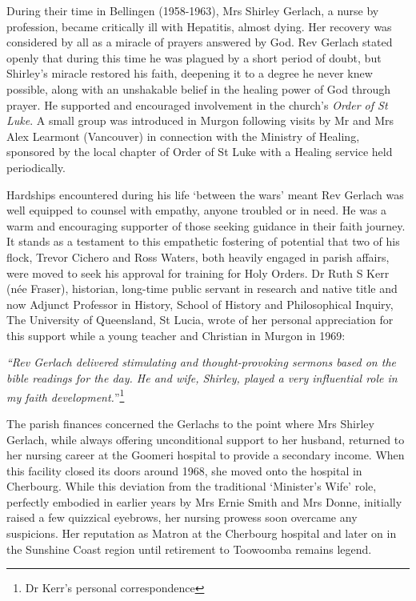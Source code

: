 During their time in Bellingen (1958-1963), Mrs Shirley Gerlach, a nurse by profession, became critically ill with Hepatitis, almost dying. Her recovery was considered by all as a miracle of prayers answered by God. Rev Gerlach stated openly that during this time he was plagued by a short period of doubt, but Shirley's miracle restored his faith, deepening it to a degree he never knew possible, along with an unshakable belief in the healing power of God through prayer. He supported and encouraged involvement in the church's \emph{Order of St Luke}. A small group was introduced in Murgon following visits by Mr and Mrs Alex Learmont (Vancouver) in connection with the Ministry of Healing, sponsored by the local chapter of Order of St Luke with a Healing service held periodically.

Hardships encountered during his life `between the wars' meant Rev Gerlach was well equipped to counsel with empathy, anyone troubled or in need. He was a warm and encouraging supporter of those seeking guidance in their faith journey. It stands as a testament to this empathetic fostering of potential that two of his flock, Trevor Cichero and Ross Waters, both heavily engaged in parish affairs, were moved to seek his approval for training for Holy Orders. Dr Ruth S Kerr (née Fraser), historian, long-time public servant in research and native title and now Adjunct Professor in History, School of History and Philosophical Inquiry, The University of Queensland, St Lucia, wrote of her personal appreciation for this support while a young teacher and Christian in Murgon in 1969:

\emph{``Rev Gerlach delivered stimulating and thought-provoking sermons based on the bible readings for the day. He and wife, Shirley, played a very influential role in my faith development.}''\footnote{Dr Kerr's personal correspondence}

The parish finances concerned the Gerlachs to the point where Mrs Shirley Gerlach, while always offering unconditional support to her husband, returned to her nursing career at the Goomeri hospital to provide a secondary income. When this facility closed its doors around 1968, she moved onto the hospital in Cherbourg. While this deviation from the traditional `Minister's Wife' role, perfectly embodied in earlier years by Mrs Ernie Smith and Mrs Donne, initially raised a few quizzical eyebrows, her nursing prowess soon overcame any suspicions. Her reputation as Matron at the Cherbourg hospital and later on in the Sunshine Coast region until retirement to Toowoomba remains legend.

